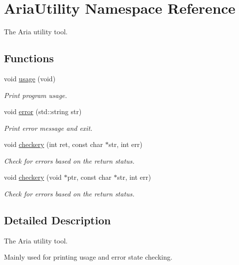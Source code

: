 \hypertarget{namespaceAriaUtility}{}\section{Aria\+Utility Namespace Reference}
\label{namespaceAriaUtility}


The Aria utility tool.  


\subsection*{Functions}
\begin{DoxyCompactItemize}
\item 
void \hyperlink{namespaceAriaUtility_ab7e1ed799d49b08e2213e48cf66d441a}{usage} (void)
\begin{DoxyCompactList}\small\item\em Print program usage. \end{DoxyCompactList}\item 
void \hyperlink{namespaceAriaUtility_a6f2e8e4929437544f4164fb7df5d4c11}{error} (std\+::string str)
\begin{DoxyCompactList}\small\item\em Print error message and exit. \end{DoxyCompactList}\item 
void \hyperlink{namespaceAriaUtility_a6b433fae13ebf1b45db31c0173cd943a}{checkery} (int ret, const char $\ast$str, int err)
\begin{DoxyCompactList}\small\item\em Check for errors based on the return status. \end{DoxyCompactList}\item 
void \hyperlink{namespaceAriaUtility_a22b217c239a92579332108e0f6310029}{checkery} (void $\ast$ptr, const char $\ast$str, int err)
\begin{DoxyCompactList}\small\item\em Check for errors based on the return status. \end{DoxyCompactList}\end{DoxyCompactItemize}


\subsection{Detailed Description}
The Aria utility tool. 

Mainly used for printing usage and error state checking. 

